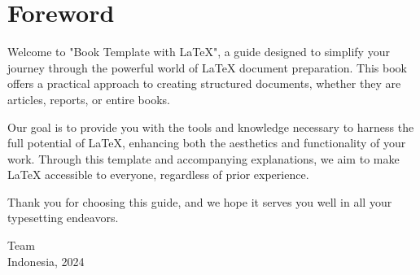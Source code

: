 \chapter*{Foreword}

\fontsize{9pt}{10pt}\selectfont
Welcome to "Book Template with \LaTeX", a guide designed to simplify your journey through the powerful world of LaTeX document preparation. This book offers a practical approach to creating structured documents, whether they are articles, reports, or entire books.

Our goal is to provide you with the tools and knowledge necessary to harness the full potential of LaTeX, enhancing both the aesthetics and functionality of your work. Through this template and accompanying explanations, we aim to make LaTeX accessible to everyone, regardless of prior experience.

Thank you for choosing this guide, and we hope it serves you well in all your typesetting endeavors.

\vspace{15pt}

\noindent Team \\
\noindent Indonesia, 2024

\normalsize